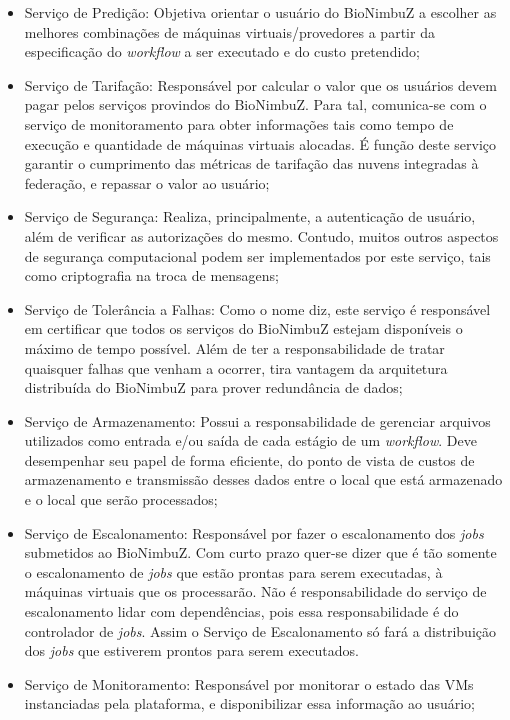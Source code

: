 	\begin{itemize}
		\item Serviço de Predição: Objetiva orientar o usuário do BioNimbuZ a escolher as melhores combinações de máquinas virtuais/provedores a partir da especificação do \textit{workflow} a ser executado e do custo pretendido;
		\item Serviço de Tarifação: Responsável por calcular o valor que os usuários devem pagar pelos serviços provindos do BioNimbuZ. Para tal, comunica-se com o serviço de monitoramento para obter informações tais como tempo de execução e quantidade de máquinas virtuais alocadas. É função deste serviço garantir o cumprimento das métricas de tarifação das nuvens integradas à federação, e repassar o valor ao usuário;
		\item Serviço de Segurança: Realiza, principalmente, a autenticação de usuário, além de verificar as autorizações do mesmo. Contudo, muitos outros aspectos de segurança computacional podem ser implementados por este serviço, tais como criptografia na troca de mensagens;
		\item Serviço de Tolerância a Falhas: Como o nome diz, este serviço é responsável em certificar que todos os serviços do BioNimbuZ estejam disponíveis o máximo de tempo possível. Além de ter a responsabilidade de tratar quaisquer falhas que venham a ocorrer, tira vantagem da arquitetura distribuída do BioNimbuZ para prover redundância de dados;
		\item Serviço de Armazenamento: Possui a responsabilidade de gerenciar arquivos utilizados como entrada e/ou saída de cada estágio de um \textit{workflow}. Deve desempenhar seu papel de forma eficiente, do ponto de vista de custos de armazenamento e transmissão desses dados entre o local que está armazenado e o local que serão processados;
		\item Serviço de Escalonamento: Responsável por fazer o escalonamento dos \textit{jobs} submetidos ao BioNimbuZ. Com curto prazo quer-se dizer que é tão somente o escalonamento de \textit{jobs} que estão prontas para serem executadas, à máquinas virtuais que os processarão. Não é responsabilidade do serviço de escalonamento lidar com dependências, pois essa responsabilidade é do controlador de \textit{jobs}. Assim o Serviço de Escalonamento só fará a distribuição dos \textit{jobs} que estiverem prontos para serem executados.
		\item Serviço de Monitoramento: Responsável por monitorar o estado das \acrshort{VM}s instanciadas pela plataforma, e disponibilizar essa informação ao usuário;

\end{itemize}
